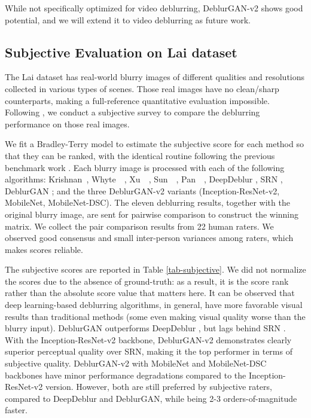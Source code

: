 \documentclass[10pt,twocolumn,letterpaper]{article}
\begin{document}
While not specifically optimized for video deblurring, DeblurGAN-v2 shows good potential, and we will extend it to video deblurring as future work.





\vspace{-0.2em}
\subsection{Subjective Evaluation on Lai dataset}
\vspace{-0.5em}
The Lai dataset \cite{lai2016comparative} has real-world blurry images of different qualities and resolutions collected in various types of scenes. Those real images have no clean/sharp counterparts, making a full-reference quantitative evaluation impossible. Following \cite{lai2016comparative}, we conduct a subjective survey to compare the deblurring performance on those real images. 

We fit a Bradley-Terry model \cite{bradley1952rank} to estimate the subjective score for each method so that they can be ranked, with the identical routine following the previous benchmark work \cite{li2019benchmarking,li2019single}. Each blurry image is processed with each of the following algorithms: Krishnan~\etal \cite{normalized_sparsity}, Whyte~\etal~\cite{whyte}, Xu~\etal ~\cite{XuUnnaturalDeblurring}, Sun~\etal~\cite{SunLearningRemoval}, Pan~\etal~\cite{darkchannelprior}, DeepDeblur \cite{Nah2016DeepDeblurring}, SRN \cite{tao2018scale}, DeblurGAN \cite{kupyn2018deblurgan}; and the three DeblurGAN-v2 variants (Inception-ResNet-v2, MobileNet, MobileNet-DSC). The eleven deblurring results, together with the original blurry image, are sent for pairwise comparison to construct the winning matrix. We collect the pair comparison results from 22 human raters. We observed good consensus and small inter-person variances among raters, which makes scores reliable. 

The subjective scores are reported in Table \ref{tab-subjective}. We did not normalize the scores due to the absence of ground-truth: as a result, it is the score rank rather than the absolute score value that matters here. It can be observed that deep learning-based deblurring algorithms, in general, have more favorable visual results than traditional methods (some even making visual quality worse than the blurry input). DeblurGAN \cite{kupyn2018deblurgan} outperforms DeepDeblur \cite{Nah2016DeepDeblurring}, but lags behind SRN \cite{tao2018scale}. With the Inception-ResNet-v2 backbone, DeblurGAN-v2 demonstrates clearly superior perceptual quality over SRN, making it the top performer in terms of subjective quality. DeblurGAN-v2 with MobileNet and MobileNet-DSC backbones have minor performance degradations compared to the Inception-ResNet-v2 version. However, both are still preferred by subjective raters, compared to DeepDeblur and DeblurGAN, while being 2-3 orders-of-magnitude faster. 
\end{document}
